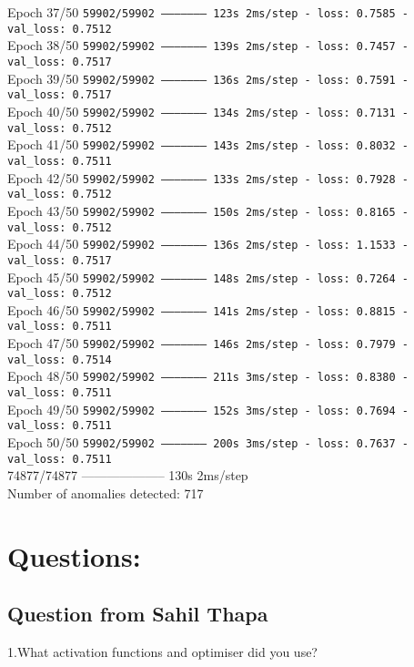 Epoch 37/50
\texttt{59902/59902 -------------------- 123s 2ms/step - loss: 0.7585 - val\_loss: 0.7512}\\
Epoch 38/50
\texttt{59902/59902 -------------------- 139s 2ms/step - loss: 0.7457 - val\_loss: 0.7517}\\
Epoch 39/50
\texttt{59902/59902 -------------------- 136s 2ms/step - loss: 0.7591 - val\_loss: 0.7517}\\
Epoch 40/50
\texttt{59902/59902 -------------------- 134s 2ms/step - loss: 0.7131 - val\_loss: 0.7512}\\
Epoch 41/50
\texttt{59902/59902 -------------------- 143s 2ms/step - loss: 0.8032 - val\_loss: 0.7511}\\
Epoch 42/50
\texttt{59902/59902 -------------------- 133s 2ms/step - loss: 0.7928 - val\_loss: 0.7512}\\
Epoch 43/50
\texttt{59902/59902 -------------------- 150s 2ms/step - loss: 0.8165 - val\_loss: 0.7512}\\
Epoch 44/50
\texttt{59902/59902 -------------------- 136s 2ms/step - loss: 1.1533 - val\_loss: 0.7517}\\
Epoch 45/50
\texttt{59902/59902 -------------------- 148s 2ms/step - loss: 0.7264 - val\_loss: 0.7512}\\
Epoch 46/50
\texttt{59902/59902 -------------------- 141s 2ms/step - loss: 0.8815 - val\_loss: 0.7511}\\
Epoch 47/50
\texttt{59902/59902 -------------------- 146s 2ms/step - loss: 0.7979 - val\_loss: 0.7514}\\
Epoch 48/50
\texttt{59902/59902 -------------------- 211s 3ms/step - loss: 0.8380 - val\_loss: 0.7511}\\
Epoch 49/50
\texttt{59902/59902 -------------------- 152s 3ms/step - loss: 0.7694 - val\_loss: 0.7511}\\
Epoch 50/50
\texttt{59902/59902 -------------------- 200s 3ms/step - loss: 0.7637 - val\_loss: 0.7511}\\
74877/74877 -------------------- 130s 2ms/step\\
Number of anomalies detected: 717

\section*{Questions: }
\subsection{Question from Sahil Thapa}
1.What activation functions and optimiser did you use?

